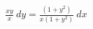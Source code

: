 \documentclass[preview]{standalone}
\begin{document}
\begin{align*}
\frac{x y}{x} \  dy = \frac{\left( 1 + {y}^{2} \right)}{x ( 1 + y^2 )} \  dx
\end{align*}
\end{document}
